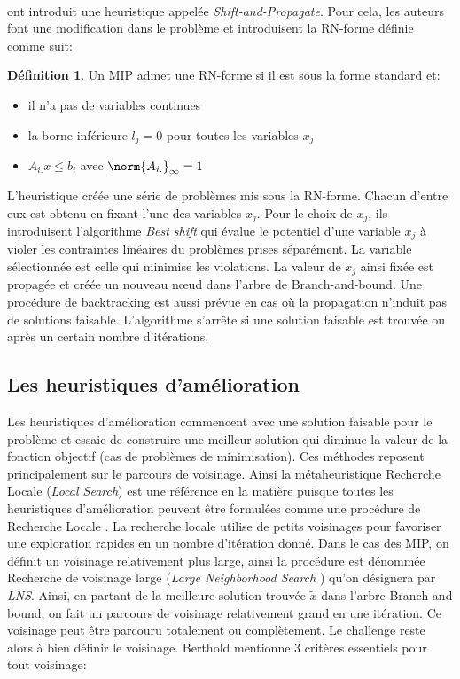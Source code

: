\documentclass[12pt,a4paper,oneside]{book}
\theoremstyle{definition}
\newtheorem{definition}{Définition}[section]
\begin{document}
	\paragraph{}
	\cite{Berthold2014} ont introduit une heuristique appelée \textit{Shift-and-Propagate}. Pour cela, les auteurs font une modification dans le problème et introduisent la RN-forme définie comme suit:
	\begin{definition} \label{def:rnform}
		Un MIP admet une RN-forme si il est sous la forme standard et:
		\begin{itemize}
			\item il n'a pas de variables continues
			\item la borne inférieure $l_j = 0$ pour toutes les variables $x_j$
			\item $A_{i.}x \leq b_i $ avec $\norm{A_{i.}}_\infty = 1$
		\end{itemize}
		
	\end{definition}
	L'heuristique créée une série de problèmes mis sous la RN-forme. Chacun d'entre eux est obtenu en fixant l'une des variables $x_j$. Pour le choix de $x_j$, ils introduisent l'algorithme \textit{Best shift} qui évalue le potentiel d'une variable $x_j$ à violer les contraintes linéaires du problèmes prises séparément. La variable sélectionnée est celle qui minimise les violations. 
	La valeur de $x_j$ ainsi fixée est propagée et créée un nouveau nœud dans l'arbre de Branch-and-bound. Une procédure de backtracking est aussi prévue en cas où la propagation n'induit pas de solutions faisable. L'algorithme s'arrête si une solution faisable est trouvée ou après un certain nombre d'itérations.
	
	\subsection{Les heuristiques d'amélioration}
	Les heuristiques d'amélioration commencent avec une solution faisable pour le problème et essaie de construire une meilleur solution qui diminue la valeur de la fonction objectif (cas de problèmes de minimisation). Ces méthodes reposent principalement sur le parcours de voisinage. Ainsi la métaheuristique Recherche Locale (\textit{Local Search}) est une référence en la matière puisque toutes les heuristiques d'amélioration peuvent être formulées comme une procédure de Recherche Locale \cite{berthold2006}. La recherche locale utilise de petits voisinages pour favoriser une exploration rapides en un nombre d'itération donné. Dans le cas des MIP, on définit un voisinage relativement plus large, ainsi la procédure est dénommée Recherche de voisinage large (\textit{Large Neighborhood Search} ) qu'on désignera par \textit{LNS}. Ainsi, en partant de la meilleure solution trouvée $\tilde{x}$ dans l'arbre Branch and bound, on fait un parcours de voisinage relativement grand en une itération. Ce voisinage peut être parcouru totalement ou complètement. Le challenge reste alors à bien définir le voisinage. Berthold \cite{berthold2014heuristic} mentionne 3 critères essentiels pour tout voisinage:
	
\end{document}
